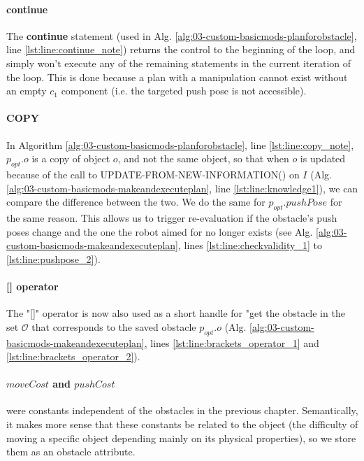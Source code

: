 \paragraph{\textbf{continue}} The \textbf{continue} statement (used in Alg. \ref{alg:03-custom-basicmods-planforobstacle}, line \ref{lst:line:continue_note}) returns the control to the beginning of the loop, and simply won't execute any of the remaining statements in the current iteration of the loop. This is done because a plan with a manipulation cannot exist without an empty $c_{1}$ component (i.e. the targeted push pose is not accessible).

\paragraph{COPY} In Algorithm \ref{alg:03-custom-basicmods-planforobstacle}, line \ref{lst:line:copy_note}, $p_{opt}.o$ is a copy of object $o$, and not the same object, so that when $o$ is updated because of the call to UPDATE-FROM-NEW-INFORMATION() on $I$ (Alg. \ref{alg:03-custom-basicmods-makeandexecuteplan}, line \ref{lst:line:knowledge1}), we can compare the difference between the two. We do the same for $p_{opt}.pushPose$ for the same reason. This allows us to trigger re-evaluation if the obstacle's push poses change and the one the robot aimed for no longer exists (see Alg. \ref{alg:03-custom-basicmods-makeandexecuteplan}, lines \ref{lst:line:checkvalidity_1} to \ref{lst:line:pushpose_2}).

\paragraph{[] operator}\label{operators_note} The "[]" operator is now also used as a short handle for "get the obstacle in the set $\mathcal{O}$ that corresponds to the saved obstacle $p_{opt}.o$ (Alg. \ref{alg:03-custom-basicmods-makeandexecuteplan}, lines \ref{lst:line:brackets_operator_1} and \ref{lst:line:brackets_operator_2}).

\paragraph{$moveCost$ and $pushCost$} were constants independent of the obstacles in the previous chapter. Semantically, it makes more sense that these constants be related to the object (the difficulty of moving a specific object depending mainly on its physical properties), so we store them as an obstacle attribute.

